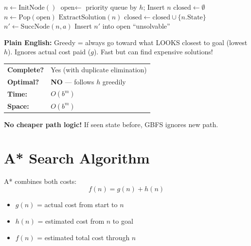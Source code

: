 \documentclass[11pt,a4paper]{article}
\begin{document}
\begin{examplebox}
\begin{algorithmic}
\STATE $n \gets \text{InitNode}()$ 
\STATE $\text{open} \gets$ priority queue by $h$; Insert $n$ 
\STATE $\text{closed} \gets \emptyset$ 
    \STATE $n \gets \text{Pop}(\text{open})$ 
     
        \RETURN $\text{ExtractSolution}(n)$
    \ENDIF
    \STATE $\text{closed} \gets \text{closed} \cup \{n.\text{State}\}$
        \STATE $n' \gets \text{SuccNode}(n, a)$
            \STATE Insert $n'$ into open 
        \ENDIF
    \ENDFOR
\ENDWHILE
\RETURN ``unsolvable''
\end{algorithmic}
\textbf{Plain English:} Greedy = always go toward what LOOKS closest to goal (lowest $h$). Ignores actual cost paid ($g$). Fast but can find expensive solutions!
\end{examplebox}

\begin{notebox}
\begin{tabular}{@{}ll@{}}
\textbf{Complete?} & Yes (with duplicate elimination) \\
\textbf{Optimal?} & \textbf{NO} --- follows $h$ greedily \\
\textbf{Time:} & $O(b^m)$ \\
\textbf{Space:} & $O(b^m)$ \\
\end{tabular}

\textbf{No cheaper path logic!} If seen state before, GBFS ignores new path.
\end{notebox}

\section{A* Search Algorithm}

\begin{definitionbox}
A* combines both costs:
\[f(n) = g(n) + h(n)\]
\begin{itemize}[leftmargin=*,nosep]
\item $g(n)$ = actual cost from start to $n$
\item $h(n)$ = estimated cost from $n$ to goal
\item $f(n)$ = estimated total cost through $n$
\end{itemize}
\end{definitionbox}
\end{document}
